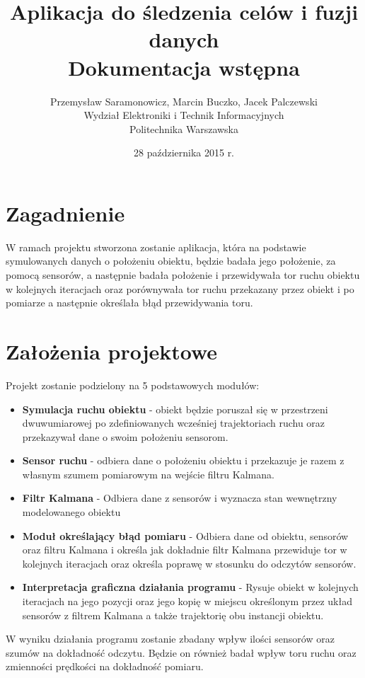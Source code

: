 \documentclass{article}
\title{Aplikacja do śledzenia celów i fuzji danych  \\ {\large Dokumentacja wstępna}}
\author{Przemysław Saramonowicz, Marcin Buczko, Jacek Palczewski \\ Wydział Elektroniki i Technik Informacyjnych \\ Politechnika Warszawska}
\date{28 października 2015 r.}
\begin{document}
	\maketitle
	
	\section{Zagadnienie}
		W ramach projektu stworzona zostanie aplikacja, która na podstawie symulowanych danych o położeniu obiektu, będzie badała jego położenie, za pomocą sensorów, a następnie badała położenie i przewidywała tor ruchu obiektu w kolejnych iteracjach oraz porównywała tor ruchu przekazany przez obiekt i po pomiarze a następnie określała błąd przewidywania toru. 
		
	\section{Założenia projektowe}
		Projekt zostanie podzielony na 5 podstawowych modułów:
		
		\begin{itemize}
		\item \textbf{Symulacja ruchu obiektu} - obiekt będzie poruszał się w przestrzeni dwuwumiarowej po zdefiniowanych wcześniej trajektoriach ruchu oraz przekazywał dane o swoim położeniu sensorom.

		\item \textbf{Sensor ruchu} - odbiera dane o położeniu obiektu i przekazuje je razem z własnym szumem pomiarowym na wejście filtru Kalmana.
		
		\item \textbf{Filtr Kalmana} - Odbiera dane z sensorów i wyznacza stan wewnętrzny modelowanego obiektu
		
		\item \textbf{Moduł określający błąd pomiaru} - Odbiera dane od obiektu, sensorów oraz filtru Kalmana i określa jak dokładnie filtr Kalmana przewiduje tor w kolejnych iteracjach oraz określa poprawę w stosunku do odczytów sensorów.
		
		\item \textbf{Interpretacja graficzna działania programu} - Rysuje obiekt w kolejnych iteracjach na jego pozycji oraz jego kopię w miejscu określonym przez układ sensorów z filtrem Kalmana a także trajektorię obu instancji obiektu.
		\end{itemize}		
		
W wyniku działania programu zostanie zbadany wpływ ilości sensorów oraz szumów na dokładność odczytu. Będzie on również badał wpływ toru ruchu oraz zmienności prędkości na dokładność pomiaru.
\end{document}
